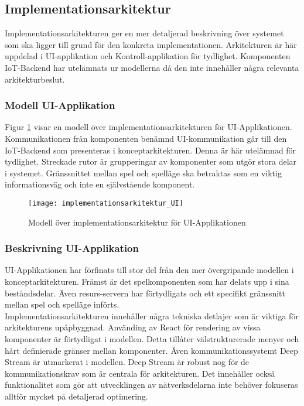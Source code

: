 \subsection{Implementationsarkitektur}
Implementationsarkitekturen ger en mer detaljerad beskrivning över systemet som ska ligger till grund för den konkreta implementationen. Arkitekturen är här uppdelad i UI-applikation och Kontroll-applikation för tydlighet. Komponenten IoT-Backend har utelämnats ur modellerna då den inte innehåller några relevanta arkitekturbeslut.

\subsubsection{Modell UI-Applikation}
Figur \ref{fig:implementationsarkitektur-UI} visar en modell över implementationsarkitekturen för UI-Applikationen. Kommunikationen från komponenten benämnd UI-kommunikation går till den IoT-Backend som presenteras i konceptarkitekturen. Denna är här utelämnad för tydlighet. Streckade rutor är grupperingar av komponenter som utgör stora delar i systemet. Gränssnittet mellan spel och spelläge ska betraktas som en viktig informationsväg och inte en självstående komponent.

\begin{figure}[h]
    \centering
    \texttt{[image: implementationsarkitektur\_UI]}
    \caption{Modell över implementationsarkitektur för UI-Applikationen}
    \label{fig:implementationsarkitektur-UI}
\end{figure}

\subsubsection{Beskrivning UI-Applikation}
UI-Applikationen har förfinats till stor del från den mer övergripande modellen i konceptarkitekturen. Främst är det spelkomponenten som har delats upp i sina beståndsdelar. Även resurs-servern har förtydligats och ett specifikt gränssnitt mellan spel och spelläge införts.\\

Implementationsarkitekturen innehåller några tekniska detlajer som är viktiga för arkitekturens upåpbyggnad. Använding av React för rendering av vissa komponenter är förtydligat i modellen. Detta tillåter välstrukturerade menyer och hårt definierade gränser mellan komponenter. Även kommunikationssystemt Deep Stream är utmarkerat i modellen. Deep Stream är robust nog för de kommunikationskrav som är centrala för arkitekturen. Det innehåller också funktionalitet som gör att utvecklingen av nätverksdelarna inte behöver fokuseras alltför mycket på detaljerad optimering.\\

